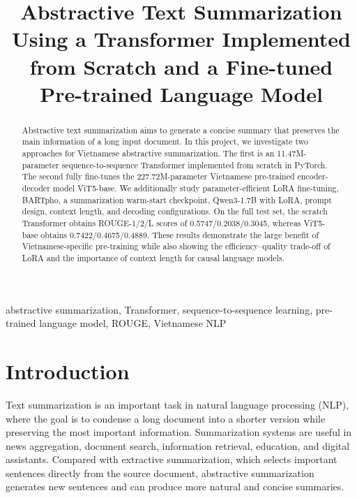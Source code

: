 \documentclass[conference]{IEEEtran}
\begin{document}
\pagestyle{plain}

\title{Abstractive Text Summarization Using a Transformer Implemented from Scratch and a Fine-tuned Pre-trained Language Model}

\author{
}

\maketitle
\thispagestyle{plain}

\begin{abstract}
Abstractive text summarization aims to generate a concise summary that preserves the main information of a long input document. In this project, we investigate two approaches for Vietnamese abstractive summarization. The first is an 11.47M-parameter sequence-to-sequence Transformer implemented from scratch in PyTorch. The second fully fine-tunes the 227.72M-parameter Vietnamese pre-trained encoder-decoder model ViT5-base. We additionally study parameter-efficient LoRA fine-tuning, BARTpho, a summarization warm-start checkpoint, Qwen3-1.7B with LoRA, prompt design, context length, and decoding configurations. On the full test set, the scratch Transformer obtains ROUGE-1/2/L scores of 0.5747/0.2038/0.3045, whereas ViT5-base obtains 0.7422/0.4675/0.4889. These results demonstrate the large benefit of Vietnamese-specific pre-training while also showing the efficiency--quality trade-off of LoRA and the importance of context length for causal language models.
\end{abstract}

\begin{IEEEkeywords}
abstractive summarization, Transformer, sequence-to-sequence learning, pre-trained language model, ROUGE, Vietnamese NLP
\end{IEEEkeywords}

\section{Introduction}
Text summarization is an important task in natural language processing (NLP), where the goal is to condense a long document into a shorter version while preserving the most important information. Summarization systems are useful in news aggregation, document search, information retrieval, education, and digital assistants. Compared with extractive summarization, which selects important sentences directly from the source document, abstractive summarization generates new sentences and can produce more natural and concise summaries.
\end{document}
